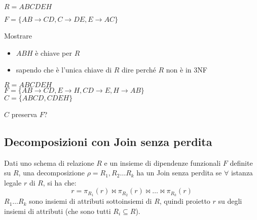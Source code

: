 \begin{esercizio}
$R = ABCDEH$

$F = \{ AB \to CD, C \to DE, E \to AC \}$

Mostrare
\begin{itemize}
    \item $ABH$ \`e chiave per $R$
    \item sapendo che \`e l'unica chiave di $R$ dire perch\'e $R$ non \`e in 3NF
\end{itemize}
\end{esercizio}

\begin{esercizio}
$R = ABCDEH$ \\
$F = \{ AB \to CD, E \to H, CD \to E, H \to AB \}$ \\
$C = \{ ABCD, CDEH \}$

$C$ preserva $F$?
\end{esercizio}

\subsection{Decomposizioni con Join senza perdita}

\begin{defn}
Dati uno schema di relazione $R$ e un insieme di dipendenze funzionali $F$ definite su $R$, una decomposizione $\rho = R_1, R_2 \dots R_k$ ha un Join senza perdita se $\forall$ istanza legale $r$ di $R$, si ha che:
\[
r = \pi_{R_1} (r) \Join \pi_{R_2} (r) \Join \dots \Join \pi_{R_k} (r)
\]
$R_1 \dots R_k$ sono insiemi di attributi sottoinsiemi di $R$, quindi proietto $r$ su degli insiemi di attributi (che sono tutti $R_i \subseteq R$).
\end{defn}

